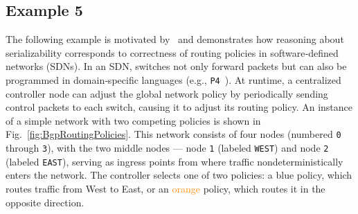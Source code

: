 %




\subsection{Example 5}

The following example is motivated by~\cite{NaGhSa24} and demonstrates how reasoning about serializability corresponds to correctness of routing policies in software‐defined networks (SDNs). In an SDN, switches not only forward packets but can also be programmed in domain‐specific languages (e.g., \texttt{P4}~\cite{BoDaGiIzMcReScTaVaVaWa14}). At runtime, a centralized controller node can adjust the global network policy by periodically sending control packets to each switch, causing it to adjust its routing policy.
%
An instance of a simple network with two competing policies is shown in Fig.~\ref{fig:BgpRoutingPolicies}. This network consists of four nodes (numbered \texttt{0} through \texttt{3}), with the two middle nodes --- node \texttt{1} (labeled \texttt{WEST}) and node \texttt{2} (labeled \texttt{EAST}), serving as ingress points from where traffic nondeterministically enters the network. The controller selects one of two policies: a \textcolor{NavyBlue}{blue} policy, which routes traffic from West to East, or an \textcolor{darkorange}{orange} policy, which routes it in the opposite direction.


